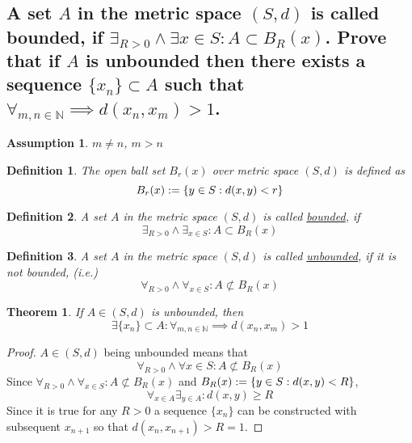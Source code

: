 \documentclass[]{article}
\newcommand{\N}{\mathbb{N}}
\newtheorem{definition}{Definition}
\newtheorem{assumption}{Assumption}
\newtheorem{theorem}{Theorem}
\begin{document}
\newpage
\section{}
\subsection{A set $A$ in the metric space $(S, d)$ is called bounded, if
    $\exists_{R>0} \land \exists x \in S : A \subset B_R(x)$.
    Prove that if $A$ is unbounded then there exists a sequence 
    $\{x_n\} \subset A$ such that $\forall_{m,n\in\N} \implies d(x_n,x_m) > 1$.
}
\begin{assumption}
    $m \neq n$, $m > n$
\end{assumption}
\begin{definition}
    The open ball set $B_r(x)$ over metric space $(S,d)$ is defined as
    $$B_r(x) := \qty{y \in S : d(x,y) < r}$$
\end{definition}
\begin{definition}
    A set $A$ in the metric space $(S, d)$ is called \underline{bounded}, if
    $$\exists_{R>0} \land \exists_{x \in S} : A \subset B_R(x)$$
\end{definition}
\begin{definition}
    A set $A$ in the metric space $(S, d)$ is called \underline{unbounded}, 
    if it is not bounded, (i.e.)
    $$\forall_{R>0} \land \forall_{x \in S} : A \not \subset  B_R(x)$$
\end{definition}
\begin{theorem}
    If $A \in (S,d)$ is unbounded, then 
    $$\exists \{x_n\} \subset A : \forall_{m,n\in\N} \implies d(x_n,x_m) > 1$$
\end{theorem}
\begin{proof}
    $A \in (S,d)$ being unbounded means that 
    $$\forall_{R>0} \land \forall x \in S : A \not\subset  B_R(x)$$
    Since $\forall_{R>0} \land \forall_{x \in S} : A \not \subset  B_R(x)$ 
    and $B_R(x) := \qty{y \in S : d(x,y) < R}$, 
    $$\forall_{x \in A} \exists_{y \in A} : d(x,y) \geq R$$
    Since it is true for any $R > 0$ a sequence $\{x_n\}$ can be constructed 
    with subsequent $x_{n+1}$ so that $d(x_n,x_{n+1})>R=1$.
\end{proof}

\end{document}
